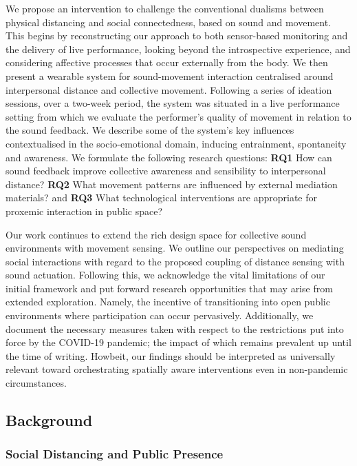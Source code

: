 We propose an intervention to challenge the conventional dualisms between physical distancing and social connectedness, based on sound and movement. This begins by reconstructing our approach to both sensor-based monitoring and the delivery of live performance, looking beyond the introspective experience, and considering affective processes that occur externally from the body. We then present a wearable system for sound-movement interaction centralised around interpersonal distance and collective movement. Following a series of ideation sessions, over a two-week period, the system was situated in a live performance setting from which we evaluate the performer's quality of movement in relation to the sound feedback. We describe some of the system’s key influences contextualised in the socio-emotional domain, inducing entrainment, spontaneity and awareness. We formulate the following research questions: \textbf{RQ1} How can sound feedback improve collective awareness and sensibility to interpersonal distance? \textbf{RQ2} What movement patterns are influenced by external mediation materials? and \textbf{RQ3} What technological interventions are appropriate for proxemic interaction in public space?

Our work continues to extend the rich design space for collective sound environments with movement sensing. We outline our perspectives on mediating social interactions with regard to the proposed coupling of distance sensing with sound actuation. Following this, we acknowledge the vital limitations of our initial framework and put forward research opportunities that may arise from extended exploration. Namely, the incentive of transitioning into open public environments where participation can occur pervasively. Additionally, we document the necessary measures taken with respect to the restrictions put into force by the COVID-19 pandemic; the impact of which remains prevalent up until the time of writing. Howbeit, our findings should be interpreted as universally relevant toward orchestrating spatially aware interventions even in non-pandemic circumstances.

\subsection{Background}
\label{sec2:Background}

\subsubsection{Social Distancing and Public Presence}
\label{subsec:public_space}

